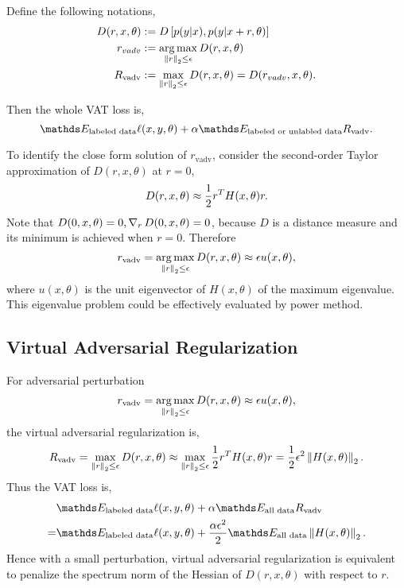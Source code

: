 \documentclass{article}
\begin{document}
Define the following notations,
\begin{equation*}
\begin{aligned}
    D(r,x,\theta) &:=D\left[p(y|x), p(y|x+r, \theta)\right] \\
    r_{vadv} &:= \operatorname*{arg\,max}_{\left\|r\right\|_2\le\epsilon} D(r,x,\theta) \\
    R_{\text{vadv}} &:= \max_{\left\|r\right\|_2\le\epsilon} D(r,x,\theta) = D(r_{vadv}, x, \theta).
\end{aligned}
\end{equation*}

Then the whole VAT loss is,
\begin{equation*}
    \Ebb_{\text{labeled data}} \ell(x,y,\theta) + \alpha\Ebb_{\text{labeled or unlabled data}}R_{\text{vadv}}.
\end{equation*}

To identify the close form solution of $r_{\text{vadv}}$, consider the second-order Taylor approximation
of $D(r,x,\theta)$ at $r=0$,
\begin{equation*}
    D(r,x,\theta) \approx \frac{1}{2} r^T H(x,\theta) r.
\end{equation*}
Note that $D(0, x, \theta) = 0, \operatorname{\nabla}_r D(0, x, \theta)=0$, because $D$ is a distance measure and its minimum is achieved when $r=0$.
Therefore
\begin{equation*}
    r_{\text{vadv}} = \operatorname*{arg\,max}_{\left\|r\right\|_2\le \epsilon}D(r,x,\theta) \approx \epsilon u(x,\theta),
\end{equation*}
where $u(x,\theta)$ is the unit eigenvector of $H(x, \theta)$ of the maximum eigenvalue.
This eigenvalue problem could be effectively evaluated by power method.

\subsection{Virtual Adversarial Regularization}
For adversarial perturbation
\begin{equation*}
    r_{\text{vadv}} = \operatorname*{arg\,max}_{\left\|r\right\|_2\le \epsilon}D(r,x,\theta) \approx \epsilon u(x,\theta),
\end{equation*}
the virtual adversarial regularization is,
\begin{equation*}
    R_{\text{vadv}} = \max_{\left\|r\right\|_2\le\epsilon} D(r,x,\theta)
    \approx \max_{\left\|r\right\|_2\le\epsilon} \frac{1}{2} r^T H(x,\theta) r = \frac{1}{2} \epsilon^2 \left\|H(x,\theta)\right\|_2.
\end{equation*}
Thus the VAT loss is,
\begin{equation*}
\begin{aligned}
    &\Ebb_{\text{labeled data}} \ell(x,y,\theta) + \alpha\Ebb_{\text{all data}}R_{\text{vadv}} \\
    =&\Ebb_{\text{labeled data}} \ell(x,y,\theta) + \frac{\alpha\epsilon^2}{2}\Ebb_{\text{all data}}\norm{H(x,\theta)}_2.
\end{aligned}
\end{equation*}
Hence with a small perturbation, virtual adversarial regularization is equivalent to penalize the spectrum norm of the Hessian of $D(r, x, \theta)$ with respect to $r$.
\end{document}
